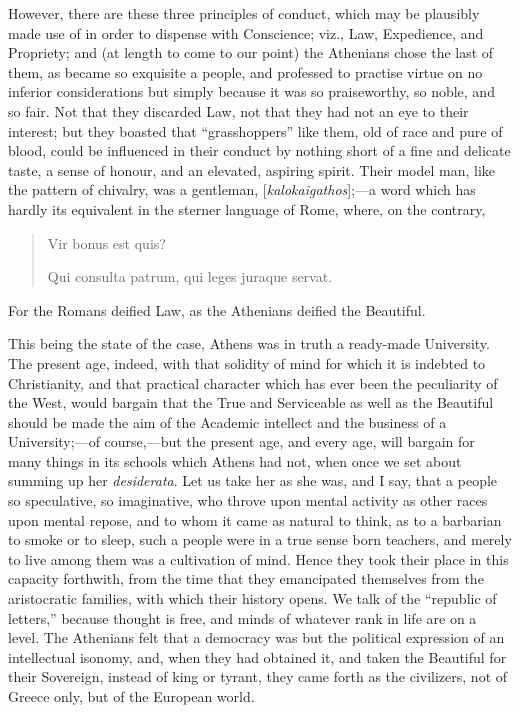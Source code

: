 However, there are these three principles of conduct, which may be
plausibly made use of in order to dispense with Conscience; viz., Law,
Expedience, and Propriety; and (at length to come to our point) the
Athenians chose the last of them, as became so exquisite a people, and
professed to practise virtue on no inferior considerations but simply
because it was so praiseworthy, so noble, and so fair. Not that they
discarded Law, not that they had not an eye to their interest; but
they boasted that ``grasshoppers'' like them, old of race and
pure of blood, could be influenced in their conduct by nothing short
of a fine and delicate taste, a sense of honour, and an elevated,
aspiring spirit. Their model man, like the pattern of chivalry,
was a gentleman, [\emph{kalokaigathos}];—a word which has hardly its
equivalent in the sterner language of Rome, where, on the contrary,

\begin{quote}

Vir bonus est quis?

Qui consulta patrum, qui leges juraque servat.

\end{quote}

For the Romans deified Law, as the Athenians deified the Beautiful.

This being the state of the case, Athens was in truth a ready-made
University. The present age, indeed, with that solidity of mind for
which it is indebted to Christianity, and that practical character
which has ever been the peculiarity of the West, would bargain that
the True and Serviceable as well as the Beautiful should be made the
aim of the Academic intellect and the business of a University;—of
course,—but the present age, and every age, will bargain for many
things in its schools which Athens had not, when once we set about
summing up her \emph{desiderata}. Let us take her as she was, and I
say, that a people so speculative, so imaginative, who throve upon
mental activity as other races upon mental repose, and to whom it came
as natural to think, as to a barbarian to smoke or to sleep, such a
people were in a true sense born teachers, and merely to live among
them was a cultivation of mind. Hence they took their place in this
capacity forthwith, from the time that they emancipated themselves
from the aristocratic families, with which their history opens. We
talk of the ``republic of letters,'' because thought is free,
and minds of whatever rank in life are on a level. The Athenians felt
that a democracy was but the political expression of an intellectual
isonomy, and, when they had obtained it, and taken the Beautiful for
their Sovereign, instead of king or tyrant, they came forth as the
civilizers, not of Greece only, but of the European world.

